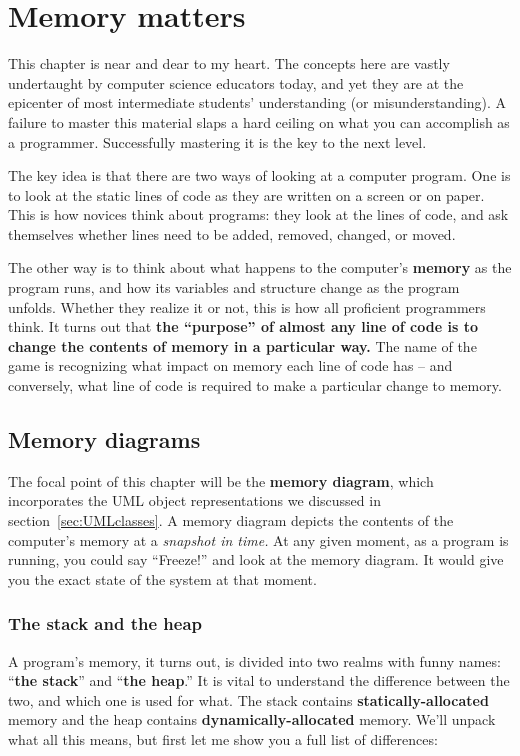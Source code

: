 
\chapter{Memory matters}
\label{ch:memoryMatters}

This chapter is near and dear to my heart. The concepts here are vastly
undertaught by computer science educators today, and yet they are at the
epicenter of most intermediate students' understanding (or misunderstanding).
A failure to master this material slaps a hard ceiling on what you can
accomplish as a programmer. Successfully mastering it is the key to the next
level.

The key idea is that there are two ways of looking at a computer program. One
is to look at the static lines of code as they are written on a screen or on
paper. This is how novices think about programs: they look at the lines of
code, and ask themselves whether lines need to be added, removed, changed, or
moved.

The other way is to think about what happens to the computer's \textbf{memory}
as the program runs, and how its variables and structure change as the program
unfolds. Whether they realize it or not, this is how all proficient
programmers think. It turns out that \textbf{the ``purpose'' of almost any line
of code is to change the contents of memory in a particular way.} The name of
the game is recognizing what impact on memory each line of code has -- and
conversely, what line of code is required to make a particular change to
memory.

\section{Memory diagrams}

The focal point of this chapter will be the \textbf{memory diagram}, which
incorporates the UML object representations we discussed in
section~\ref{sec:UMLclasses}. A memory diagram depicts the contents of the
computer's memory at a \textit{snapshot in time.} At any given moment, as a
program is running, you could say ``Freeze!'' and look at the memory diagram.
It would give you the exact state of the system at that moment.

\subsection{The stack and the heap}

A program's memory, it turns out, is divided into two realms with funny names:
``\textbf{the stack}'' and ``\textbf{the heap}.'' It is vital to understand the
difference between the two, and which one is used for what. The stack contains
\textbf{statically-allocated} memory and the heap contains
\textbf{dynamically-allocated} memory. We'll unpack what all this means, but
first let me show you a full list of differences:


